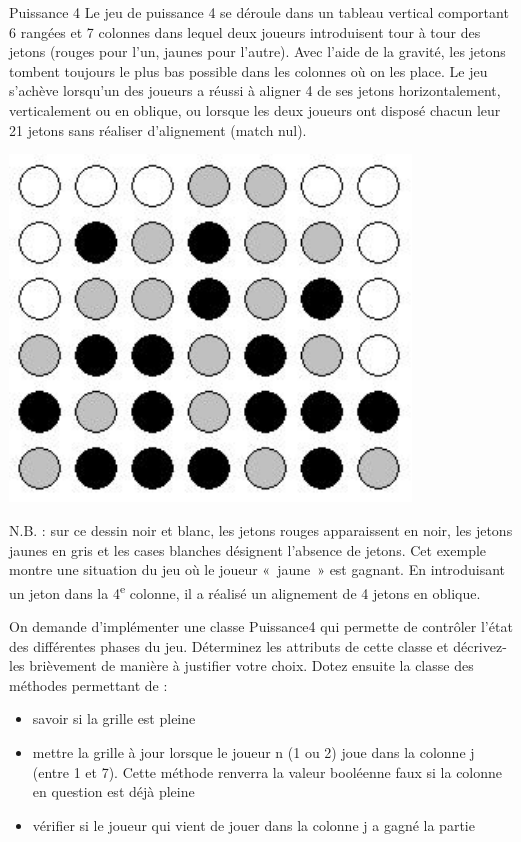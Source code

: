 \newpage
\begin{Exercice}{Puissance 4}
	Le jeu de puissance 4 se déroule dans un tableau vertical comportant 6
	rangées et 7 colonnes dans lequel deux joueurs introduisent tour à tour
	des jetons (rouges pour l’un, jaunes pour l’autre). Avec l’aide de la
	gravité, les jetons tombent toujours le plus bas possible dans les
	colonnes où on les place. Le jeu s’achève lorsqu’un des joueurs a
	réussi à aligner 4 de ses jetons horizontalement, verticalement ou en
	oblique, ou lorsque les deux joueurs ont disposé chacun leur 21 jetons
	sans réaliser d’alignement (match nul).

	\begin{minipage}[t][][b]{4cm}
	\includegraphics[width=0.8\textwidth]{image/puissance4}
	\end{minipage}
	\begin{minipage}[t][][b]{10cm}
	N.B. : sur ce dessin noir et
	blanc, les jetons rouges apparaissent en noir, les jetons jaunes en
	gris et les cases blanches désignent l'absence de
	jetons. Cet exemple montre une situation du jeu où le joueur «~jaune~»
	est gagnant. En introduisant un jeton dans la
	4\textsuperscript{e} colonne,
	il a réalisé un alignement de 4 jetons en oblique.
	\end{minipage}
	
	On demande d’implémenter une classe Puissance4 qui permette de contrôler
	l’état des différentes phases du jeu. Déterminez les attributs de cette
	classe et décrivez-les brièvement de manière à justifier votre choix.
	Dotez ensuite la classe des méthodes permettant de :

	\begin{itemize}
		\item 
			savoir si la grille est pleine
		\item 
			mettre la grille à jour lorsque le joueur n (1 ou 2) joue dans la
			colonne j (entre 1 et 7). Cette méthode renverra la valeur booléenne
			faux si la colonne en question est déjà pleine
		\item 
			vérifier si le joueur qui vient de jouer dans la colonne j a gagné la
			partie
	\end{itemize}
	

\end{Exercice}
